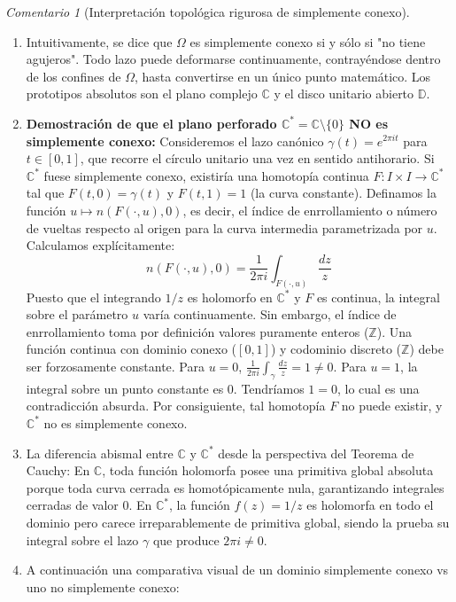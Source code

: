 \documentclass[11pt,a4paper]{article}
\theoremstyle{definition}
\theoremstyle{remark}
\newtheorem{observacion}{Comentario}[section]
\numberwithin{equation}{section}
\begin{document}
\begin{observacion}[Interpretación topológica rigurosa de simplemente conexo]
\begin{enumerate}
    \item Intuitivamente, se dice que $\Omega$ es simplemente conexo si y sólo si "no tiene agujeros". Todo lazo puede deformarse continuamente, contrayéndose dentro de los confines de $\Omega$, hasta convertirse en un único punto matemático. Los prototipos absolutos son el plano complejo $\mathbb{C}$ y el disco unitario abierto $\mathbb{D}$.
    \item \textbf{Demostración de que el plano perforado $\mathbb{C}^* = \mathbb{C} \setminus \{0\}$ NO es simplemente conexo:} Consideremos el lazo canónico $\gamma(t) = e^{2\pi i t}$ para $t \in [0,1]$, que recorre el círculo unitario una vez en sentido antihorario. Si $\mathbb{C}^*$ fuese simplemente conexo, existiría una homotopía continua $F : I \times I \to \mathbb{C}^*$ tal que $F(t,0) = \gamma(t)$ y $F(t,1) = 1$ (la curva constante). Definamos la función $u \mapsto n(F(\cdot, u), 0)$, es decir, el índice de enrrollamiento o número de vueltas respecto al origen para la curva intermedia parametrizada por $u$. 
    Calculamos explícitamente:
    $$ n(F(\cdot, u), 0) = \frac{1}{2\pi i} \int_{F(\cdot, u)} \frac{dz}{z} $$
    Puesto que el integrando $1/z$ es holomorfo en $\mathbb{C}^*$ y $F$ es continua, la integral sobre el parámetro $u$ varía continuamente. Sin embargo, el índice de enrrollamiento toma por definición valores puramente enteros ($\mathbb{Z}$). Una función continua con dominio conexo ($[0,1]$) y codominio discreto ($\mathbb{Z}$) debe ser forzosamente constante. 
    Para $u=0$, $\frac{1}{2\pi i}\int_{\gamma} \frac{dz}{z} = 1 \neq 0$.
    Para $u=1$, la integral sobre un punto constante es $0$. 
    Tendríamos $1 = 0$, lo cual es una contradicción absurda. Por consiguiente, tal homotopía $F$ no puede existir, y $\mathbb{C}^*$ no es simplemente conexo.
    \item La diferencia abismal entre $\mathbb{C}$ y $\mathbb{C}^*$ desde la perspectiva del Teorema de Cauchy: En $\mathbb{C}$, toda función holomorfa posee una primitiva global absoluta porque toda curva cerrada es homotópicamente nula, garantizando integrales cerradas de valor 0. En $\mathbb{C}^*$, la función $f(z) = 1/z$ es holomorfa en todo el dominio pero carece irreparablemente de primitiva global, siendo la prueba su integral sobre el lazo $\gamma$ que produce $2\pi i \neq 0$.
    \item A continuación una comparativa visual de un dominio simplemente conexo vs uno no simplemente conexo:
\end{enumerate}


\end{observacion}
\end{document}
